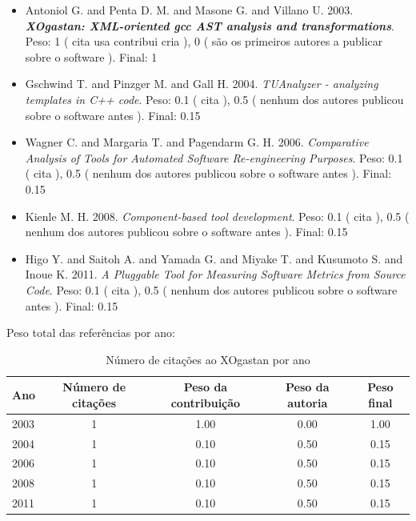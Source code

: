 \begin{itemize}
\item Antoniol G. and Penta D. M. and Masone G. and Villano U.
      2003.
        \textbf{\textit{ XOgastan: XML-oriented gcc AST analysis and transformations}}.
      Peso:
      1 (
          cita
          usa
          contribui
          cria
      ),
      0 (
são os primeiros autores a publicar sobre o software
      ).
      Final:
      1

\item Gschwind T. and Pinzger M. and Gall H.
      2004.
        \textit{ TUAnalyzer - analyzing templates in C++ code}.
      Peso:
      0.1 (
          cita
      ),
      0.5 (
nenhum dos autores publicou sobre o software antes
      ).
      Final:
      0.15

\item Wagner C. and Margaria T. and Pagendarm G. H.
      2006.
        \textit{ Comparative Analysis of Tools for Automated Software Re-engineering Purposes}.
      Peso:
      0.1 (
          cita
      ),
      0.5 (
nenhum dos autores publicou sobre o software antes
      ).
      Final:
      0.15

\item Kienle M. H.
      2008.
        \textit{ Component-based tool development}.
      Peso:
      0.1 (
          cita
      ),
      0.5 (
nenhum dos autores publicou sobre o software antes
      ).
      Final:
      0.15

\item Higo Y. and Saitoh A. and Yamada G. and Miyake T. and Kusumoto S. and Inoue K.
      2011.
        \textit{ A Pluggable Tool for Measuring Software Metrics from Source Code}.
      Peso:
      0.1 (
          cita
      ),
      0.5 (
nenhum dos autores publicou sobre o software antes
      ).
      Final:
      0.15

\end{itemize}

Peso total das referências por ano:

\begin{table}[h]
\caption{Número de citações ao XOgastan por ano}
\centering
\begin{tabular}{| l | c | c | c | c |}
  \hline
  Ano & Número de citações & Peso da contribuição & Peso da autoria & Peso final \\
  \hline
  2003
    & 1
    & 1.00
    & 0.00
    & 1.00 \\
  2004
    & 1
    & 0.10
    & 0.50
    & 0.15 \\
  2006
    & 1
    & 0.10
    & 0.50
    & 0.15 \\
  2008
    & 1
    & 0.10
    & 0.50
    & 0.15 \\
  2011
    & 1
    & 0.10
    & 0.50
    & 0.15 \\
  \hline
\end{tabular}
\end{table}




